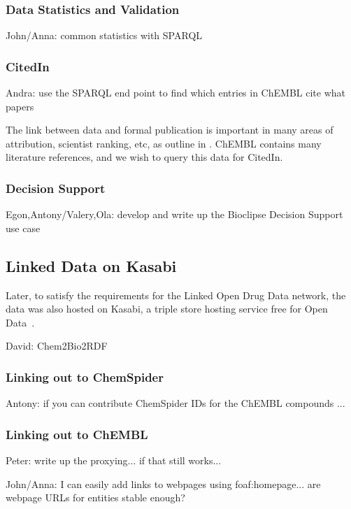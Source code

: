 \documentclass[sw]{iosart2c}
\begin{document}
\subsubsection{Data Statistics and Validation}

John/Anna: common statistics with SPARQL

\subsubsection{CitedIn}

Andra: use the SPARQL end point to find which entries in ChEMBL cite what papers
 
The link between data and formal publication is important in many areas of
attribution, scientist ranking, etc, as outline in \cite{Waagmeester2012}.
ChEMBL contains many literature references, and we wish to query this data
for CitedIn.

\subsubsection{Decision Support}

Egon,Antony/Valery,Ola: develop and write up the Bioclipse Decision Support use case

\subsection{Linked Data on Kasabi}

Later, to satisfy the requirements for the Linked Open Drug Data \cite{Samwald2011}
network, the data was also hosted on Kasabi, a triple store hosting service
free for Open Data~\cite{kasabi}.

David: Chem2Bio2RDF

\subsubsection{Linking out to ChemSpider}

Antony: if you can contribute ChemSpider IDs for the ChEMBL compounds ...

\subsubsection{Linking out to ChEMBL}
Peter: write up the proxying... if that still works...


John/Anna: I can easily add links to webpages using foaf:homepage... are webpage URLs for entities stable enough?
\end{document}
